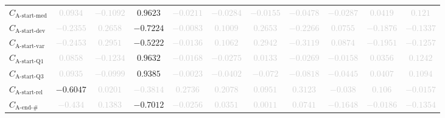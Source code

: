\documentclass{standalone}
\newcommand{\startactivitiesrelname}{\text{A-start-rel}}
\newcommand{\startactivitiesrel}{C_{\startactivitiesrelname}}
\newcommand{\startmedianname}{\text{A-start-med}}
\newcommand{\startmedian}{C_{\startmedianname}}
\newcommand{\startdevname}{\text{A-start-dev}}
\newcommand{\startdev}{C_{\startdevname}}
\newcommand{\startvarname}{\text{A-start-var}}
\newcommand{\startvar}{C_{\startvarname}}
\newcommand{\startqonename}{\text{A-start-Q1}}
\newcommand{\startqone}{C_{\startqonename}}
\newcommand{\startqthreename}{\text{A-start-Q3}}
\newcommand{\startqthree}{C_{\startqthreename}}
\newcommand{\lastactivitiesname}{\text{A-end-\#}}
\newcommand{\lastactivities}{C_{\lastactivitiesname}}
\begin{document}
\begin{tabular}{lcccccccccc}
$\startmedian$ & \textcolor{lightgray}{$0.0934$} & \textcolor{lightgray}{$-0.1092$} & $0.9623$ & \textcolor{lightgray}{$-0.0211$} & \textcolor{lightgray}{$-0.0284$} & \textcolor{lightgray}{$-0.0155$} & \textcolor{lightgray}{$-0.0478$} & \textcolor{lightgray}{$-0.0287$} & \textcolor{lightgray}{$0.0419$} & \textcolor{lightgray}{$0.121$} \\ 
$\startdev$ & \textcolor{lightgray}{$-0.2355$} & \textcolor{lightgray}{$0.2658$} & $-0.7224$ & \textcolor{lightgray}{$-0.0083$} & \textcolor{lightgray}{$0.1009$} & \textcolor{lightgray}{$0.2653$} & \textcolor{lightgray}{$-0.2266$} & \textcolor{lightgray}{$0.0755$} & \textcolor{lightgray}{$-0.1876$} & \textcolor{lightgray}{$-0.1337$} \\ 
$\startvar$ & \textcolor{lightgray}{$-0.2453$} & \textcolor{lightgray}{$0.2951$} & $-0.5222$ & \textcolor{lightgray}{$-0.0136$} & \textcolor{lightgray}{$0.1062$} & \textcolor{lightgray}{$0.2942$} & \textcolor{lightgray}{$-0.3119$} & \textcolor{lightgray}{$0.0874$} & \textcolor{lightgray}{$-0.1951$} & \textcolor{lightgray}{$-0.1257$} \\ 
$\startqone$ & \textcolor{lightgray}{$0.0858$} & \textcolor{lightgray}{$-0.1234$} & $0.9632$ & \textcolor{lightgray}{$-0.0168$} & \textcolor{lightgray}{$-0.0275$} & \textcolor{lightgray}{$0.0133$} & \textcolor{lightgray}{$-0.0269$} & \textcolor{lightgray}{$-0.0158$} & \textcolor{lightgray}{$0.0356$} & \textcolor{lightgray}{$0.1242$} \\ 
$\startqthree$ & \textcolor{lightgray}{$0.0935$} & \textcolor{lightgray}{$-0.0999$} & $0.9385$ & \textcolor{lightgray}{$-0.0023$} & \textcolor{lightgray}{$-0.0402$} & \textcolor{lightgray}{$-0.072$} & \textcolor{lightgray}{$-0.0818$} & \textcolor{lightgray}{$-0.0445$} & \textcolor{lightgray}{$0.0407$} & \textcolor{lightgray}{$0.1094$} \\ 
$\startactivitiesrel$ & $-0.6047$ & \textcolor{lightgray}{$0.0201$} & \textcolor{lightgray}{$-0.3814$} & \textcolor{lightgray}{$0.2736$} & \textcolor{lightgray}{$0.2078$} & \textcolor{lightgray}{$0.0951$} & \textcolor{lightgray}{$0.3123$} & \textcolor{lightgray}{$-0.038$} & \textcolor{lightgray}{$0.106$} & \textcolor{lightgray}{$-0.0157$} \\ 
$\lastactivities$ & \textcolor{lightgray}{$-0.434$} & \textcolor{lightgray}{$0.1383$} & $-0.7012$ & \textcolor{lightgray}{$-0.0256$} & \textcolor{lightgray}{$0.0351$} & \textcolor{lightgray}{$0.0011$} & \textcolor{lightgray}{$0.0741$} & \textcolor{lightgray}{$-0.1648$} & \textcolor{lightgray}{$-0.0186$} & \textcolor{lightgray}{$-0.1354$} \\ 

\end{tabular}
\end{document}
